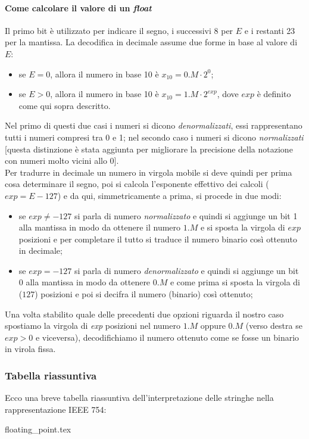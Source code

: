 \documentclass[class=book, crop=false]{standalone}
\begin{document}
\paragraph{Come calcolare il valore di un \emph{float}} Il primo bit è utilizzato per indicare il segno, i successivi 8 per $E$ e i restanti 23 per la mantissa. La decodifica in decimale assume due forme in base al valore di $E$:
\begin{itemize}[noitemsep,nolistsep]
	\item se $E=0$, allora il numero in base 10 è $x_{10}=0.M \cdot 2^{0}$;
	\item se $E>0$, allora il numero in base 10 è $x_{10}=1.M \cdot 2^{exp}$, dove $exp$ è definito come qui sopra descritto.
\end{itemize}
Nel primo di questi due casi i numeri si dicono \emph{denormalizzati}, essi rappresentano tutti i numeri compresi tra 0 e 1; nel secondo caso i numeri si dicono \emph{normalizzati} [questa distinzione è stata aggiunta per migliorare la precisione della notazione con numeri molto vicini allo 0].\\
Per tradurre in decimale un numero in virgola mobile si deve quindi per prima cosa determinare il segno, poi si calcola l'esponente effettivo dei calcoli ($exp=E-127$) e da qui, simmetricamente a prima, si procede in due modi: \\
\begin{itemize}[noitemsep,nolistsep]
	\item se $exp\neq-127$ si parla di numero \emph{normalizzato} e quindi si aggiunge un bit 1 alla mantissa in modo da ottenere il numero $1.M$ e si sposta la virgola di $exp$ posizioni e per completare il tutto si traduce il numero binario così ottenuto in decimale;
	\item se $exp=-127$ si parla di numero \emph{denormalizzato} e quindi si aggiunge un bit 0 alla mantissa in modo da ottenere $0.M$ e come prima si sposta la virgola di ($127$) posizioni e poi si decifra il numero (binario) così ottenuto;
\end{itemize}

Una volta stabilito quale delle precedenti due opzioni riguarda il nostro caso spostiamo la virgola di \emph{exp} posizioni nel numero $1.M$ oppure $0.M$ (verso destra se $exp>0$ e viceversa), decodifichiamo il numero ottenuto come se fosse un binario in virola fissa.\\
\subsubsection{Tabella riassuntiva}
Ecco una breve tabella riassuntiva dell'interpretazione delle stringhe nella rappresentazione IEEE 754:
\begin{table}[h!]
	\centering
	{floating_point.tex}
\end{table}
\end{document}
